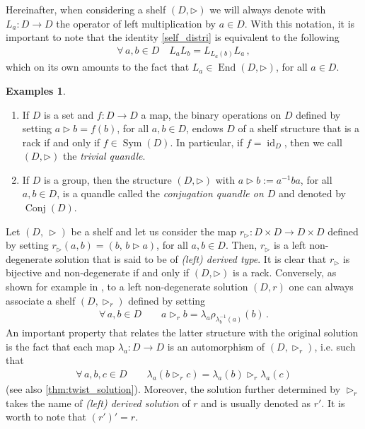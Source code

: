 \documentclass[preprint,1p]{elsarticle}
\numberwithin{equation}{section}
\theoremstyle{definition}               %
\newtheorem{exs}[theor]{Examples}
\newcommand{\tr}{\triangleright}
\DeclareMathOperator{\Sym}{Sym}
\DeclareMathOperator{\Conj}{Conj}
\DeclareMathOperator{\End}{End}
\DeclareMathOperator{\id}{id}
\begin{document}
{Hereinafter, when considering a shelf $(D,\tr)$ we will always denote with $L_a:D \to D$ the operator of left multiplication by $a \in D$.
With this notation, it is important to note that the identity \eqref{self_distri} is equivalent to the following
\begin{align}\label{self_distri1}
    \forall\, a,b \in D \quad L_aL_b = L_{L_a(b)}L_a \,,
\end{align}
which on its own amounts to the fact that $L_a \in \End(D,\tr)$, for all $a \in D$.}

\begin{exs}\,
    \begin{enumerate}
        \item[1)] If $D$ is a set and $f:D\to D$ a map, the binary operations on $D$ defined by setting $a \tr b = f(b)$, for all $a,b\in D$, endows $D$ of a shelf structure that is a rack if and only if $f \in \Sym(D)$. In particular, if $f=\id_D$, then we call $\left(D,\triangleright\right)$ the \emph{trivial quandle}.
        \item[2)] If $D$ is a group, then the structure $\left(D,\triangleright\right)$ with $a\triangleright b:= a^{-1}ba$, for all $a,b\in D$, is a quandle called the \emph{conjugation quandle on $D$} and denoted by $\Conj(D)$.
    \end{enumerate}
\end{exs}

Let $\left(D,\,\tr\right)$ be a shelf and let us consider the map $r_{\tr}:D \times D \to D \times D$ defined by setting $r_{\tr}(a,b) = \left(b,\, b\tr a\right)$, for all $a,b \in D$.
Then, $r_\tr$ is a left non-degenerate solution that is said to be of \emph{(left) derived type}.
It is clear that $r_{\tr}$ is bijective and non-degenerate if and only if $(D,\tr)$ is a rack.
Conversely, as shown for example in \cite{Le18}, to a left non-degenerate solution $\left(D, r\right)$ one can always associate a shelf $\left(D,\triangleright_r\right)$ defined by setting
\begin{align*}
    \forall\, a,b\in D\qquad a \tr_r b = \lambda_a\rho_{\lambda_b^{-1}(a)}(b) \,.
\end{align*}
{An important property that relates the latter structure with the original solution is the fact that each map $\lambda_a:D \to D$ is an automorphism of $(D,\tr_r)$, i.e. such that
\begin{align}\label{lambda_auto}
    \forall\, a,b,c\in D\qquad \lambda_a(b \tr_r c) = \lambda_a(b) \tr_r \lambda_a(c)
\end{align}
(see also \cref{thm:twist_solution}). Moreover}, the solution further determined by $\tr_r$ takes the name of \emph{(left) derived solution} of $r$ and is usually denoted as $r'$.
It is worth to note that $(r')' = r$.
\end{document}
